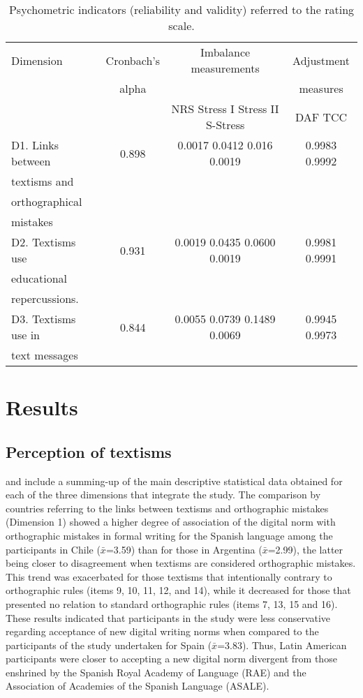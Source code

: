 \documentclass[english]{textolivre}
\begin{document}
\begin{table}[htpb]
\caption{Psychometric indicators (reliability and validity) referred to the rating scale.}
\label{tbl-tabela-02}
\centering
\begin{tabular}{lccc}
\toprule 
Dimension & Cronbach's & Imbalance measurements & Adjustment \\
& alpha & & measures\\
\midrule
& & NRS   Stress I Stress II S-Stress & DAF TCC\\
D1. Links between & 0.898 & 0.0017	0.0412	0.016	0.0019	& 0.9983	0.9992\\
textisms and \\
orthographical \\
mistakes\\
D2. Textisms use & 0.931 & 0.0019	0.0435	0.0600	0.0019	& 0.9981	0.9991\\
educational \\
repercussions.\\
D3. Textisms use in & 0.844 & 0.0055	0.0739	0.1489	0.0069	& 0.9945	0.9973\\ 
text messages\\
\bottomrule
\end{tabular}
\end{table}

\section{Results}

\subsection{Perception of textisms}
 and  include a summing-up of the main descriptive statistical data obtained for each of the three dimensions that integrate the study. The comparison by countries referring to the links between textisms and orthographic mistakes (Dimension 1) showed a higher degree of association of the digital norm with orthographic mistakes in formal writing for the Spanish language among the participants in Chile ($\bar{x}$=3.59) than for those in Argentina ($\bar{x}$=2.99), the latter being closer to disagreement when textisms are considered orthographic mistakes. This trend was exacerbated for those textisms that intentionally contrary to orthographic rules (items 9, 10, 11, 12, and 14), while it decreased for those that presented no relation to standard orthographic rules (items 7, 13, 15 and 16). These results indicated that participants in the study were less conservative regarding acceptance of new digital writing norms when compared to the participants of the study undertaken for Spain ($\bar{x}$=3.83). Thus, Latin American participants were closer to accepting a new digital norm divergent from those enshrined by the Spanish Royal Academy of Language (RAE) and the Association of Academies of the Spanish Language (ASALE).
\end{document}
